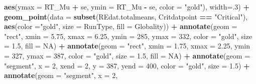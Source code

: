 \documentclass[
]{article}
\newenvironment{Shaded}{\begin{snugshade}}{\end{snugshade}}
\newcommand{\DataTypeTok}[1]{\textcolor[rgb]{0.13,0.29,0.53}{#1}}
\newcommand{\DecValTok}[1]{\textcolor[rgb]{0.00,0.00,0.81}{#1}}
\newcommand{\FloatTok}[1]{\textcolor[rgb]{0.00,0.00,0.81}{#1}}
\newcommand{\KeywordTok}[1]{\textcolor[rgb]{0.13,0.29,0.53}{\textbf{#1}}}
\newcommand{\NormalTok}[1]{#1}
\newcommand{\OperatorTok}[1]{\textcolor[rgb]{0.81,0.36,0.00}{\textbf{#1}}}
\newcommand{\OtherTok}[1]{\textcolor[rgb]{0.56,0.35,0.01}{#1}}
\newcommand{\StringTok}[1]{\textcolor[rgb]{0.31,0.60,0.02}{#1}}
\begin{document}
\begin{Shaded}
\begin{Highlighting}[]
                \KeywordTok{aes}\NormalTok{(}\DataTypeTok{ymax =}\NormalTok{ RT_Mu }\OperatorTok{+}\StringTok{ }\NormalTok{se, }
                    \DataTypeTok{ymin =}\NormalTok{ RT_Mu }\OperatorTok{-}\StringTok{ }\NormalTok{se, }
                    \DataTypeTok{color =} \StringTok{"gold"}\NormalTok{), }
                \DataTypeTok{width=}\NormalTok{.}\DecValTok{3}\NormalTok{) }\OperatorTok{+}
\StringTok{  }\KeywordTok{geom_point}\NormalTok{(}\DataTypeTok{data =} \KeywordTok{subset}\NormalTok{(REdat.totalmeans, }
\NormalTok{                           Critdatpoint }\OperatorTok{==}\StringTok{ "Critical"}\NormalTok{),}
             \KeywordTok{aes}\NormalTok{(}\DataTypeTok{color =}\StringTok{"gold"}\NormalTok{, }
                 \DataTypeTok{size =}\NormalTok{ RunType,}
                 \DataTypeTok{fill =}\NormalTok{ Globality)) }\OperatorTok{+}
\StringTok{   }\KeywordTok{annotate}\NormalTok{(}\DataTypeTok{geom =} \StringTok{"rect"}\NormalTok{, }
           \DataTypeTok{xmin =} \FloatTok{5.75}\NormalTok{, }
           \DataTypeTok{xmax =} \FloatTok{6.25}\NormalTok{, }
           \DataTypeTok{ymin =} \DecValTok{285}\NormalTok{, }
           \DataTypeTok{ymax =} \DecValTok{332}\NormalTok{, }
           \DataTypeTok{color =} \StringTok{"gold"}\NormalTok{,}
           \DataTypeTok{size =} \FloatTok{1.5}\NormalTok{,}
           \DataTypeTok{fill =} \OtherTok{NA}\NormalTok{) }\OperatorTok{+}
\StringTok{  }\KeywordTok{annotate}\NormalTok{(}\DataTypeTok{geom =} \StringTok{"rect"}\NormalTok{, }
           \DataTypeTok{xmin =} \FloatTok{1.75}\NormalTok{, }
           \DataTypeTok{xmax =} \FloatTok{2.25}\NormalTok{, }
           \DataTypeTok{ymin =} \DecValTok{327}\NormalTok{, }
           \DataTypeTok{ymax =} \DecValTok{387}\NormalTok{, }
           \DataTypeTok{color =} \StringTok{"gold"}\NormalTok{,}
           \DataTypeTok{size =} \FloatTok{1.5}\NormalTok{,}
           \DataTypeTok{fill =} \OtherTok{NA}\NormalTok{) }\OperatorTok{+}
\StringTok{  }\KeywordTok{annotate}\NormalTok{(}\DataTypeTok{geom =} \StringTok{"segment"}\NormalTok{, }
           \DataTypeTok{x =} \DecValTok{2}\NormalTok{, }
           \DataTypeTok{xend =} \DecValTok{2}\NormalTok{, }
           \DataTypeTok{y =} \DecValTok{387}\NormalTok{, }
           \DataTypeTok{yend =} \DecValTok{400}\NormalTok{, }
           \DataTypeTok{color =} \StringTok{"gold"}\NormalTok{,}
           \DataTypeTok{size =} \FloatTok{1.5}\NormalTok{) }\OperatorTok{+}
\StringTok{  }\KeywordTok{annotate}\NormalTok{(}\DataTypeTok{geom =} \StringTok{"segment"}\NormalTok{, }
           \DataTypeTok{x =} \DecValTok{2}\NormalTok{, }

\end{Highlighting}
\end{Shaded}
\end{document}
